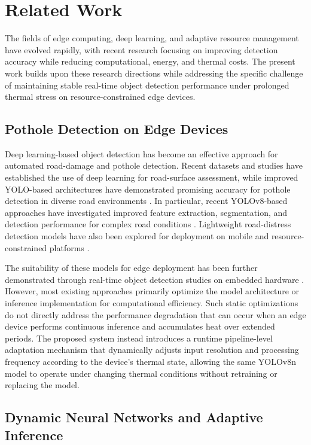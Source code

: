 \documentclass{ieeeaccess}
\begin{document}
\section{Related Work}
\label{sec:related_work}
The fields of edge computing, deep learning, and adaptive resource management have evolved rapidly, with recent research focusing on improving detection accuracy while reducing computational, energy, and thermal costs. The present work builds upon these research directions while addressing the specific challenge of maintaining stable real-time object detection performance under prolonged thermal stress on resource-constrained edge devices.

\subsection{Pothole Detection on Edge Devices}

Deep learning-based object detection has become an effective approach for automated road-damage and pothole detection. Recent datasets and studies have established the use of deep learning for road-surface assessment, while improved YOLO-based architectures have demonstrated promising accuracy for pothole detection in diverse road environments \cite{b1,b2,b5,b6}. In particular, recent YOLOv8-based approaches have investigated improved feature extraction, segmentation, and detection performance for complex road conditions \cite{b3,b11,b12}. Lightweight road-distress detection models have also been explored for deployment on mobile and resource-constrained platforms \cite{b6}.

The suitability of these models for edge deployment has been further demonstrated through real-time object detection studies on embedded hardware \cite{b13,b14}. However, most existing approaches primarily optimize the model architecture or inference implementation for computational efficiency. Such static optimizations do not directly address the performance degradation that can occur when an edge device performs continuous inference and accumulates heat over extended periods. The proposed system instead introduces a runtime pipeline-level adaptation mechanism that dynamically adjusts input resolution and processing frequency according to the device's thermal state, allowing the same YOLOv8n model to operate under changing thermal conditions without retraining or replacing the model.

\subsection{Dynamic Neural Networks and Adaptive Inference}
\end{document}
